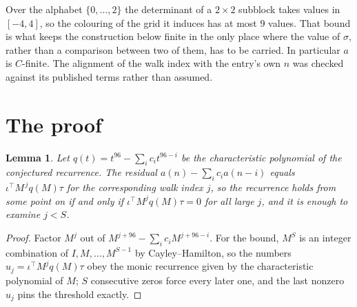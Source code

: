 \documentclass[11pt,a4paper]{article}
\theoremstyle{plain}
\newtheorem{lemma}[theorem]{Lemma}
\theoremstyle{definition}
\begin{document}
Over the alphabet $\{0,\dots,2\}$ the determinant of a $2\times2$ subblock takes values in
$[-4,4]$, so the colouring of the grid it induces has at most $9$ values.
That bound is what keeps the construction below finite in the only place where the value of
$\sigma$, rather than a comparison between two of them, has to be carried.
In particular $a$ is $C$-finite. The alignment of the walk index with the entry's own $n$ was
checked against its published terms rather than assumed.

\section{The proof}

\begin{lemma}\label{lem:crit}
Let $q(t)=t^{96}-\sum_i c_it^{96-i}$ be the characteristic polynomial of the
conjectured recurrence. The residual $a(n)-\sum_ic_ia(n-i)$ equals
$\iota^{\!\top}M^{\,j}q(M)\tau$ for the corresponding walk index $j$, so the recurrence
holds from some point on if and only if $\iota^{\!\top}M^{j}q(M)\tau=0$ for all large $j$,
and it is enough to examine $j<S$.
\end{lemma}

\begin{proof}
Factor $M^{j}$ out of $M^{j+96}-\sum_ic_iM^{j+96-i}$. For the bound, $M^{S}$
is an integer combination of $I,M,\dots,M^{S-1}$ by Cayley--Hamilton, so the numbers
$u_j=\iota^{\!\top}M^{j}q(M)\tau$ obey the monic recurrence given by the characteristic
polynomial of $M$; $S$ consecutive zeros force every later one, and the last nonzero $u_j$
pins the threshold exactly.
\end{proof}
\end{document}
